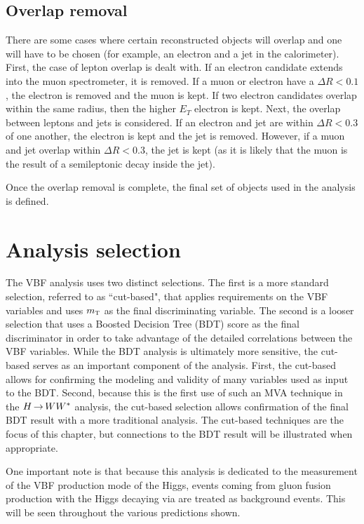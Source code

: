 \subsection{Overlap removal}

There are some cases where certain reconstructed objects will overlap and one will have to be chosen (for example, an electron and a jet in the calorimeter). First, the case of lepton overlap is dealt with. If an electron candidate extends into the muon spectrometer, it is removed. If a muon or electron have a $\Delta R < 0.1$, the electron is removed and the muon is kept. If two electron candidates overlap within the same radius, then the higher $E_{T}$ electron is kept. Next, the overlap between leptons and jets is considered. If an electron and jet are within $\Delta R < 0.3$ of one another, the electron is kept and the jet is removed. However, if a muon and jet overlap within $\Delta R < 0.3$, the jet is kept (as it is likely that the muon is the result of a semileptonic decay inside the jet). 

Once the overlap removal is complete, the final set of objects used in the analysis is defined. 


\section{Analysis selection}

The VBF analysis uses two distinct selections. The first is a more standard selection, referred to as ``cut-based", that applies requirements on the VBF variables and uses $m_{\textrm{\footnotesize\sc t}}$ as the final discriminating variable. The second is a looser selection that uses a Boosted Decision Tree (BDT) score as the final discriminator in order to take advantage of the detailed correlations between the VBF variables.  While the BDT analysis is ultimately more sensitive, the cut-based serves as an important component of the analysis. First, the cut-based allows for confirming the modeling and validity of many variables used as input to the BDT. Second, because this is the first use of such an MVA technique in the $H{\,{\rightarrow}\,}WW^\ast$ analysis, the cut-based selection allows confirmation of the final BDT result with a more traditional analysis. The cut-based techniques are the focus of this chapter, but connections to the BDT result will be illustrated when appropriate. 

One important note is that because this analysis is dedicated to the measurement of the VBF production mode of the Higgs, events coming from gluon fusion production with the Higgs decaying via \HWWfull are treated as background events. This will be seen throughout the various predictions shown. 


